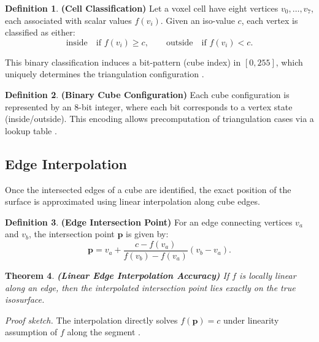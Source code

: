 \documentclass[12pt, a4paper, oneside]{book}
\theoremstyle{plain}
\newtheorem{theorem}{Theorem}[chapter]
\theoremstyle{definition}
\newtheorem{definition}[theorem]{Definition}
\theoremstyle{remark}
\theoremstyle{definition}
\begin{document}
\vspace{0.5em}

\begin{definition}
    \textbf{(Cell Classification)}
Let a voxel cell have eight vertices $v_0, \dots, v_7$, each associated with scalar values $f(v_i)$. Given an iso-value $c$, each vertex is classified as either:
\[
\text{inside} \quad \text{if } f(v_i) \geq c, \qquad \text{outside} \quad \text{if } f(v_i) < c.
\]
\end{definition}

This binary classification induces a bit-pattern (cube index) in $[0,255]$, which uniquely determines the triangulation configuration \cite{lorensen1998marching}.

\vspace{0.5em}

\begin{definition}
    \textbf{(Binary Cube Configuration)}
Each cube configuration is represented by an 8-bit integer, where each bit corresponds to a vertex state (inside/outside). This encoding allows precomputation of triangulation cases via a lookup table \cite{lorensen1998marching}.

\end{definition}

\vspace{0.5em}

\subsection{Edge Interpolation}

Once the intersected edges of a cube are identified, the exact position of the surface is approximated using linear interpolation along cube edges.

\begin{definition}
    \textbf{(Edge Intersection Point)}
For an edge connecting vertices $v_a$ and $v_b$, the intersection point $\mathbf{p}$ is given by:
\[
\mathbf{p} = v_a + \frac{c - f(v_a)}{f(v_b) - f(v_a)} (v_b - v_a).
\]
\end{definition}

\begin{theorem}
    \textbf{(Linear Edge Interpolation Accuracy)}
If $f$ is locally linear along an edge, then the interpolated intersection point lies exactly on the true isosurface.
\end{theorem}


\textit{Proof sketch.} The interpolation directly solves $f(\mathbf{p}) = c$ under linearity assumption of $f$ along the segment \cite{lorensen1998marching}.
\end{document}
